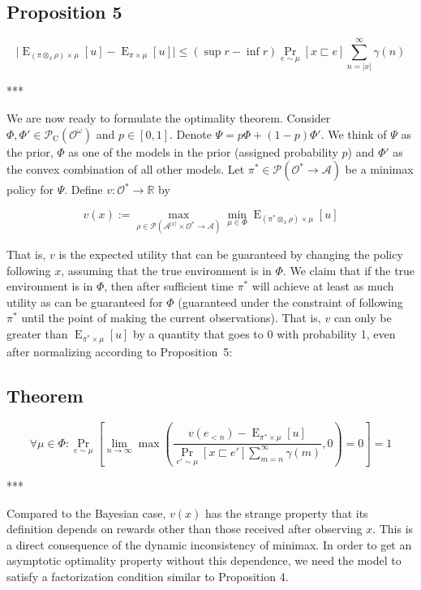 \documentclass[a4paper]{article}
\DeclareMathOperator{\Prb}{Pr}
\DeclareMathOperator{\E}{E}
\newcommand{\Reals}{\mathbb{R}}
\newcommand{\Abs}[1]{\lvert #1 \rvert}
\newcommand{\Prob}{\mathcal{P}}
\newcommand{\Act}{\mathcal{A}}
\newcommand{\Obs}{\mathcal{O}}
\newcommand{\ObsO}{\Obs^\omega}
\newcommand{\Pol}{\Obs^* \rightarrow \Act}
\newcommand{\CC}{\mathcal{P}_{\operatorname{C}}}
\begin{document}
\subsection{Proposition 5}

$$\Abs{\E_{(\pi \otimes_x \rho) \times \mu}[u]-\E_{\pi \times \mu}[u]} \leq (\sup r - \inf r) \Prb_{e \sim \mu}[x \sqsubset e] \sum_{n = \Abs{x}}^\infty \gamma(n)$$

***

We are now ready to formulate the optimality theorem. Consider ${\Phi,\Phi' \in \CC(\ObsO)}$ and ${p \in [0,1]}$. Denote ${\Psi = p \Phi + (1-p) \Phi'}$. We think of ${\Psi}$ as the prior, ${\Phi}$ as one of the models in the prior (assigned probability ${p}$) and ${\Phi'}$ as the convex combination of all other models. Let ${\pi^* \in \Prob(\Pol)}$ be a minimax policy for ${\Psi}$. Define ${v: \Obs^* \rightarrow \Reals}$ by

$$v(x):=\max_{\rho \in \Prob(\Act^{\Abs{x}} \times \Obs^* \rightarrow \Act)} \min_{\mu \in \Phi} \E_{(\pi^* \otimes_x \rho) \times \mu}[u]$$

That is, ${v}$ is the expected utility that can be guaranteed by changing the policy following ${x}$, assuming that the true environment is in ${\Phi}$. We claim that if the true environment is in ${\Phi}$, then after sufficient time ${\pi^*}$ will achieve at least as much utility as can be guaranteed for ${\Phi}$ (guaranteed under the constraint of following ${\pi^*}$ until the point of making the current observations). That is, ${v}$ can only be greater than ${\E_{\pi^* \times \mu}[u]}$ by a quantity that goes to 0 with probability 1, even after normalizing according to Proposition~5:

\subsection{Theorem}

$$\forall \mu \in \Phi: \Prb_{e \sim \mu}[\lim_{n \rightarrow \infty} \max(\frac{v(e_{<n})-\E_{\pi^* \times \mu}[u]}{\Prb_{e' \sim \mu}[x \sqsubset e'] \sum_{m = n}^\infty \gamma(m)},0)=0] = 1$$

***

Compared to the Bayesian case, ${v(x)}$ has the strange property that its definition depends on rewards other than those received after observing ${x}$. This is a direct consequence of the dynamic inconsistency of minimax. In order to get an asymptotic optimality property without this dependence, we need the model to satisfy a factorization condition similar to Proposition 4.
\end{document}
